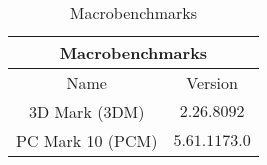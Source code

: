 \begin{table}[H]
    \centering
    \begin{tabular}{|| c | c ||}
    \hline
    \multicolumn{2}{||c||}{Macrobenchmarks} \\ [0.5ex] \hline\hline
    Name & Version \\\hline
    3D Mark (3DM) & $2.26.8092$ \\
    PC Mark 10 (PCM) & $5.61.1173.0$ \\\hline
    \end{tabular}
    \caption{Macrobenchmarks}
    \label{tab:macrobenchmarks}
\end{table}